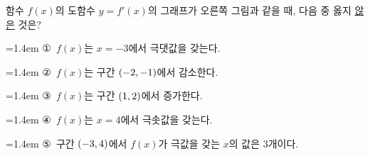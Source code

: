 \noindent\begin{minipage}[t]{0.58\linewidth}\vspace{0pt}\raggedright 함수 $f(x)$의 도함수 $y=f'(x)$의 그래프가 오른쪽 그림과 같을 때, 다음 중 옳지 \underline{않은} 것은?\end{minipage}\hfill\begin{minipage}[t]{0.4\linewidth}\vspace{0pt}\centering \resizebox{\ifdim\width>\linewidth\linewidth\else\width\fi}{!}{}\end{minipage}\par
\par\medskip\par\noindent\hangindent=1.4em {\small ①}\ $f(x)$는 $x=-3$에서 극댓값을 갖는다.\par\noindent\hangindent=1.4em {\small ②}\ $f(x)$는 구간 $(-2{,}\mkern3mu\mathopen{}-1)$에서 감소한다.\par\noindent\hangindent=1.4em {\small ③}\ $f(x)$는 구간 $(1{,}\mkern3mu\mathopen{}2)$에서 증가한다.\par\noindent\hangindent=1.4em {\small ④}\ $f(x)$는 $x=4$에서 극솟값을 갖는다.\par\noindent\hangindent=1.4em {\small ⑤}\ 구간 $(-3{,}\mkern3mu\mathopen{}4)$에서 $f(x)$가 극값을 갖는 $x$의 값은 3개이다.\par\medskip
